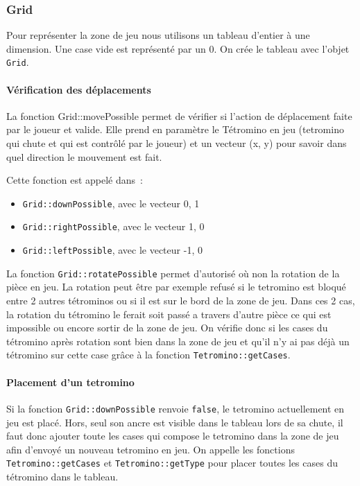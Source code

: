 \documentclass[a4paper, 12pt]{article}
\begin{document}
		\subsubsection{Grid}
			Pour représenter la zone de jeu nous utilisons un tableau d’entier à une dimension. Une case vide est représenté par un 0. 
			On crée le tableau avec l’objet \texttt{Grid}.

			\paragraph{Vérification des déplacements}
				La fonction Grid::movePossible permet de vérifier si l’action de déplacement faite par le joueur et valide. Elle prend en paramètre le Tétromino en jeu (tetromino qui chute et qui est contrôlé par le joueur) et un vecteur (x, y) pour savoir dans quel direction le mouvement est fait.

				Cette fonction est appelé dans : 
				\begin{itemize}
					\item \texttt{Grid::downPossible}, avec le vecteur {0, 1}
					\item \texttt{Grid::rightPossible}, avec le vecteur {1, 0}
					\item \texttt{Grid::leftPossible}, avec le vecteur {-1, 0}
				\end{itemize}

				La fonction \texttt{Grid::rotatePossible} permet d’autorisé où non la rotation de la pièce en jeu. La rotation peut être par exemple refusé si le tetromino est bloqué entre 2 autres tétrominos ou si il est sur le bord de la zone de jeu. Dans ces 2 cas, la rotation du tétromino le ferait soit passé a travers d’autre pièce ce qui est impossible ou encore sortir de la zone de jeu. On vérifie donc si les cases du tétromino après rotation sont bien dans la zone de jeu et qu'il n'y ai pas déjà un tétromino sur cette case grâce à la fonction \texttt{Tetromino::getCases}.

			\paragraph{Placement d’un tetromino}
				Si la fonction \texttt{Grid::downPossible} renvoie \texttt{false}, le tetromino actuellement en jeu est placé. Hors, seul son ancre est visible dans le tableau lors de sa chute, il faut donc ajouter toute les cases qui compose le tetromino dans la zone de jeu afin d’envoyé un nouveau tetromino en jeu.
				On appelle les fonctions \texttt{Tetromino::getCases} et \texttt{Tetromino::getType} pour placer toutes les cases du tétromino dans le tableau.
\end{document}
